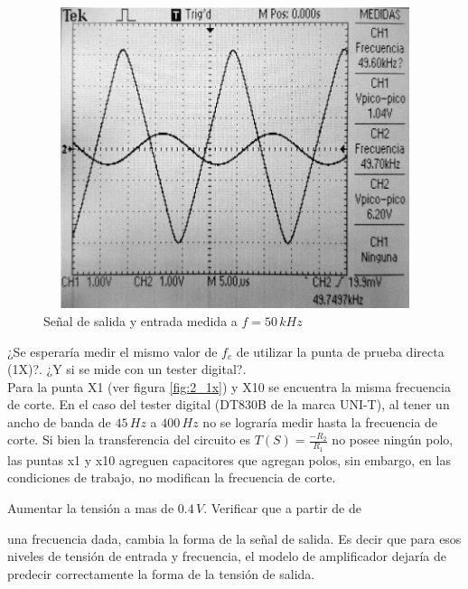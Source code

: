 \documentclass[10pt,spanish,a4paper,openany,notitlepage]{article}
\begin{document}
\begin{enumerate}
\begin{figure}[H]
\centering
\includegraphics[width=350pt, height=250pt]{mediciones/A2-ultima_preg.jpg}
\caption{Señal de salida y entrada medida a $f = 50\,\unit{kHz}$}
\label{fig:22_tiempo}
\end{figure}


\end{enumerate}

{\color{OliveGreen}¿Se esperaría medir el mismo valor de ${f}_{c}$ de utilizar la punta de
prueba directa (1X)?. ¿Y si se mide con un tester digital?.}\\

Para la punta X1 (ver figura \ref{fig:2_1x}) y X10 se encuentra la misma frecuencia de corte. En el caso
del tester digital (DT830B de la marca UNI-T), al tener un ancho de banda de $45\,\unit{Hz}$
a $400\,\unit{Hz}$ no se lograría medir hasta la frecuencia de corte. Si bien la transferencia del circuito es $T(S) = \frac{-R_2}{R_1}$ no posee ningún polo, las puntas x1 y x10 agreguen capacitores que agregan polos, sin embargo, en las condiciones de trabajo, no modifican la frecuencia de corte.\\

{\color{OliveGreen}Aumentar la tensión a mas de $0.4\,\unit{V}$. Verificar que a partir de de

una frecuencia dada, cambia la forma de la señal de salida. Es decir que para esos niveles de
tensión de entrada y frecuencia, el modelo de amplificador dejaría de predecir correctamente
la forma de la tensión de salida.}\\
\end{document}
